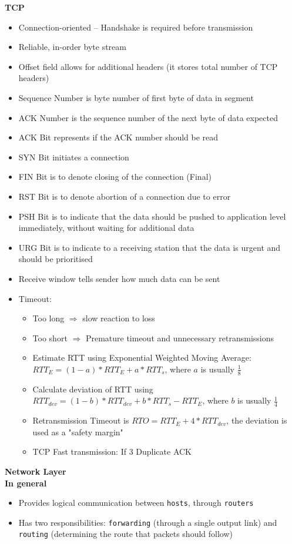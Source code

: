 \documentclass[a4paper]{article} \usepackage[backend=biber, style=numeric, sorting=none]{biblatex}
\begin{document}
\begin{multicols*}{4}
\textbf{TCP}
\begin{itemize}[leftmargin=*]
\item Connection-oriented -- Handshake is required before transmission
\item Reliable, in-order byte stream
\item Offset field allows for additional headers (it stores total number of TCP headers)
\item Sequence Number is byte number of first byte of data in segment
\item ACK Number is the sequence number of the next byte of data expected
\item ACK Bit represents if the ACK number should be read
\item SYN Bit initiates a connection
\item FIN Bit is to denote closing of the connection (Final)
\item RST Bit is to denote abortion of a connection due to error
\item PSH Bit is to indicate that the data should be pushed to application level immediately, without waiting for additional data
\item URG Bit is to indicate to a receiving station that the data is urgent and should be prioritised
\item Receive window tells sender how much data can be sent
\item Timeout:
  \begin{itemize}[leftmargin=*]
  \item Too long $\Rightarrow$ slow reaction to loss
  \item Too short $\Rightarrow$ Premature timeout and unnecessary retransmissions
  \item Estimate RTT using Exponential Weighted Moving Average: $RTT_E = (1 - a) * RTT_E + a * RTT_s$, where $a$ is usually $\frac{1}{8}$
  \item Calculate deviation of RTT using $RTT_{dev} = (1 - b) * RTT_{dev} + b*RTT_s - RTT_E$, where $b$ is usually $\frac{1}{4}$
  \item Retransmission Timeout is $RTO = RTT_{E} + 4 * RTT_{dev}$, the deviation is used as a "safety margin"
  \item TCP Fast transmission: If 3 Duplicate ACK
  \end{itemize}
\end{itemize}


{\small\textbf{Network Layer}} \\
\textbf{In general}
\begin{itemize}[leftmargin=*]
\item Provides logical communication between \texttt{hosts}, through \texttt{routers}
\item Has two responsibilities: \texttt{forwarding} (through a single output link) and \texttt{routing} (determining the route that packets should follow)
\end{itemize}


\end{multicols*}
\end{document}

